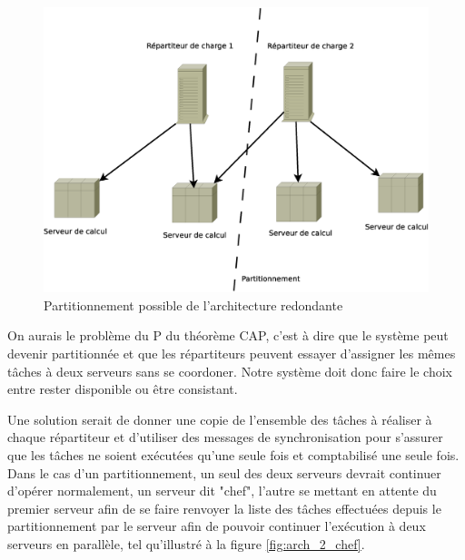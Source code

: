 \begin{figure}
  \includegraphics[width=\linewidth]{Arch_2_part.eps}
  \caption{Partitionnement possible de l'architecture redondante}
  \label{fig:arch_part}
\end{figure}

On aurais le problème du P du théorème CAP, c'est à dire que le système peut devenir partitionnée et que les répartiteurs 
peuvent essayer d'assigner les mêmes tâches à deux serveurs sans se coordoner. Notre système doit donc faire le choix entre rester
disponible ou être consistant. 

Une solution serait de donner une copie de l'ensemble des tâches à réaliser à chaque répartiteur et d'utiliser des messages de synchronisation pour s'assurer que les 
tâches ne soient exécutées qu'une seule fois et comptabilisé une seule fois. Dans le cas d'un partitionnement, un seul des deux serveurs devrait continuer d'opérer normalement, 
un serveur dit "chef", l'autre se mettant en attente du premier serveur afin de se faire renvoyer la liste des tâches effectuées depuis le partitionnement par le serveur 
afin de pouvoir continuer l'exécution à deux serveurs en parallèle, tel qu'illustré à la figure \ref{fig:arch_2_chef}.

